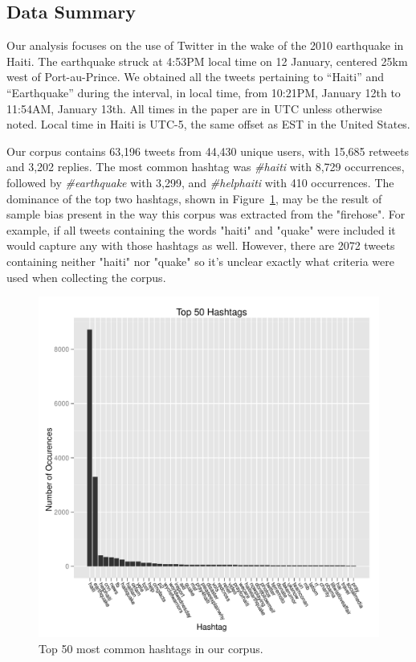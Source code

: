 \documentclass[a4paper, 11pt, titlepage]{article}
\begin{document}
\subsection{Data Summary}
Our analysis focuses on the use of Twitter in the wake of the 2010 earthquake in Haiti. The earthquake struck at 4:53PM local time on 12 January, centered 25km west of Port-au-Prince. We obtained all the tweets pertaining to ``Haiti'' and ``Earthquake'' during the interval, in local time, from 10:21PM, January 12th to 11:54AM, January 13th.  All times in the paper are in UTC unless otherwise noted.  Local time in Haiti is UTC-5, the same offset as EST in the United States.

Our corpus contains 63,196 tweets from 44,430 unique users, with 15,685 retweets and 3,202 replies. The most common hashtag was \textit{\#haiti} with 8,729 occurrences, followed by \textit{\#earthquake} with 3,299, and \textit{\#helphaiti} with 410 occurrences. The dominance of the top two hashtags, shown in Figure~\ref{fig:hashtag_counts}, may be the result of sample bias present in the way this corpus was extracted from the "firehose". For example, if all tweets containing the words "haiti" and "quake" were included it would capture any with those hashtags as well. However, there are 2072 tweets containing neither "haiti" nor "quake" so it's unclear exactly what criteria were used when collecting the corpus.

\begin{figure}[h!]
\centering
\includegraphics[width=\textwidth]{../figures/hashtag_counts.pdf}
\caption{Top 50 most common hashtags in our corpus.}
\label{fig:hashtag_counts}
\end{figure}
\end{document}

